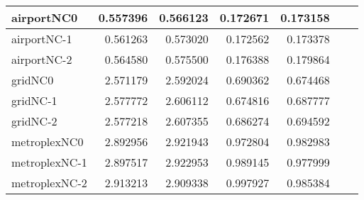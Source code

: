\begin{longtable}{|l|r|r|r|r|r|r|}
airportNC0 & 0.557396 & 0.566123 & 0.172671 & 0.173158 \\ \hline
airportNC-1 & 0.561263 & 0.573020 & 0.172562 & 0.173378 \\ \hline
airportNC-2 & 0.564580 & 0.575500 & 0.176388 & 0.179864 \\ \hline
gridNC0 & 2.571179 & 2.592024 & 0.690362 & 0.674468 \\ \hline
gridNC-1 & 2.577772 & 2.606112 & 0.674816 & 0.687777 \\ \hline
gridNC-2 & 2.577218 & 2.607355 & 0.686274 & 0.694592 \\ \hline
metroplexNC0 & 2.892956 & 2.921943 & 0.972804 & 0.982983 \\ \hline
metroplexNC-1 & 2.897517 & 2.922953 & 0.989145 & 0.977999 \\ \hline
metroplexNC-2 & 2.913213 & 2.909338 & 0.997927 & 0.985384 \\ \hline
\end{longtable}
